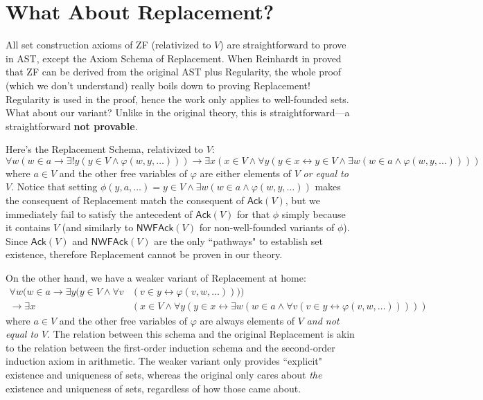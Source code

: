 \documentclass{article}
\begin{document}
\section{What About Replacement?}
All set construction axioms of ZF (relativized to $V$) are straightforward to prove in AST, except the Axiom Schema of Replacement. When Reinhardt in \cite{reinhardt} proved that ZF can be derived from the original AST plus Regularity, the whole proof (which we don't understand) really boils down to proving Replacement! Regularity is used in the proof, hence the work only applies to well-founded sets. What about our variant? Unlike in the original theory, this is straightforward---a straightforward \textbf{not provable}.

Here's the Replacement Schema, relativized to $V$:
$$\forall w(w \in a \rightarrow \exists! y(y \in V \wedge \varphi(w, y, \ldots))) \rightarrow \exists x(x \in V \wedge \forall y(y \in x \leftrightarrow y \in V \wedge \exists w(w \in a \wedge \varphi(w, y, \ldots))))$$
where $a \in V$ and the other free variables of $\varphi$ are either elements of $V$ \textit{or equal to} $V$. Notice that setting $\phi(y, a, \ldots) = y \in V \wedge \exists w( w \in a \wedge \varphi(w, y, \ldots))$ makes the consequent of Replacement match the consequent of $\textsf{Ack}(V)$, but we immediately fail to satisfy the antecedent of $\textsf{Ack}(V)$ for that $\phi$ simply because it contains $V$ (and similarly to $\textsf{NWFAck}(V)$ for non-well-founded variants of $\phi$). Since $\textsf{Ack}(V)$ and $\textsf{NWFAck}(V)$ are the only ``pathways" to establish set existence, therefore Replacement cannot be proven in our theory.

On the other hand, we have a weaker variant of Replacement at home:
\begin{align*}
    \forall w(w \in a \rightarrow \exists y(y \in V \wedge \forall v &(v \in y \leftrightarrow \varphi(v, w, \ldots)))) \\ \rightarrow \exists x &(x \in V \wedge \forall y(y \in x \leftrightarrow \exists w(w \in a \wedge \forall v (v \in y \leftrightarrow \varphi(v, w, \ldots)))))
\end{align*}
where $a \in V$ and the other free variables of $\varphi$ are always elements of $V$ \textit{and not equal to} $V$. The relation between this schema and the original Replacement is akin to the relation between the first-order induction schema and the second-order induction axiom in arithmetic. The weaker variant only provides ``explicit" existence and uniqueness of sets, whereas the original only cares about \textit{the} existence and uniqueness of sets, regardless of how those came about.



\end{document}
